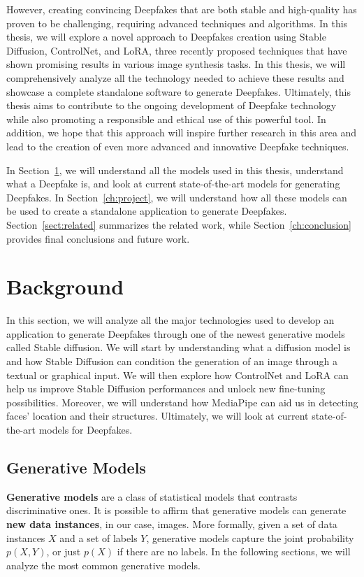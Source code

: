 \documentclass[preprint]{elsarticle}
\begin{document}
However, creating convincing Deepfakes that are both stable and high-quality has proven 
to be challenging, requiring advanced techniques and algorithms. 
In this thesis, we will explore a novel approach to Deepfakes creation using 
Stable Diffusion, ControlNet, and LoRA, three recently proposed techniques that 
have shown promising results in various image synthesis tasks. 
In this thesis, we will comprehensively analyze all the technology needed to achieve these 
results and showcase a complete standalone software to generate Deepfakes. 
Ultimately, this thesis aims to contribute to the ongoing development of 
Deepfake technology while also promoting a responsible and ethical use of this powerful tool. 
In addition, we hope that this approach will inspire further research in this area and 
lead to the creation of even more advanced and innovative Deepfake techniques.



In Section~\ref{ch:background}, we will understand all the models used in this thesis, understand what a Deepfake is, and look at current state-of-the-art models for generating Deepfakes.
In Section~\ref{ch:project}, we will understand how all these models can be used to create a standalone application to generate Deepfakes. Section~\ref{sect:related} summarizes the related work, while Section~\ref{ch:conclusion} provides final conclusions and future work.


\section{Background}\label{ch:background}


In this section, we will analyze all the major technologies used to develop an application to generate 
Deepfakes through one of the newest generative models called Stable diffusion. 
We will start by understanding what a diffusion model is and how Stable Diffusion can condition the 
generation of an image through a textual or graphical input. 
We will then explore how ControlNet and LoRA can help us improve Stable Diffusion performances and unlock new fine-tuning possibilities. 
Moreover, we will understand how MediaPipe can aid us in detecting faces' location and their structures. 
Ultimately, we will look at current state-of-the-art models for Deepfakes.



\subsection{Generative Models} \label{sec:imggenmodels}
\textbf{Generative models} are a class of statistical models that contrasts discriminative ones. 
It is possible to affirm that generative models can generate \textbf{new data instances}, 
in our case, images. 
More formally, given a set of data instances $X$ and a set of labels $Y$, 
generative models capture the joint probability $p(X, Y)$, or just $p(X)$ if there are no labels. 
In the following sections, we will analyze the most common generative models.
\end{document}
